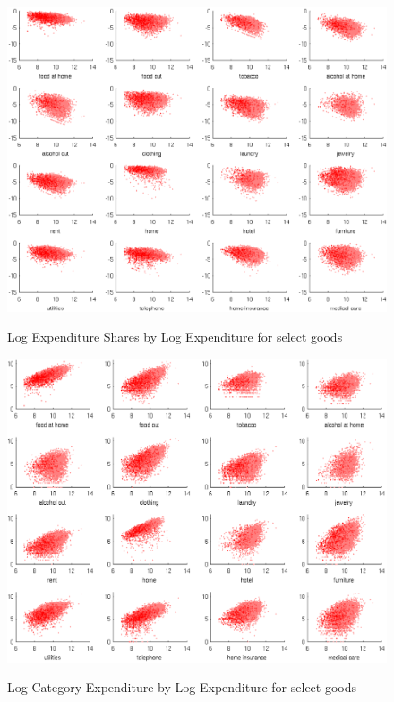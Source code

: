 \documentclass[12pt]{article}
\begin{document}
\begin{figure}
	\centering
		\includegraphics[scale=1]{pics/shares_cropped.pdf}
	\label{fig:shr}
	\caption{Log Expenditure Shares by Log Expenditure for select goods}
\end{figure}
\begin{figure}
	\centering
		\includegraphics[scale=1]{pics/levels_cropped.pdf}
	\label{fig:lev}
	\caption{Log Category Expenditure by Log Expenditure for select goods}
\end{figure}
\end{document}
